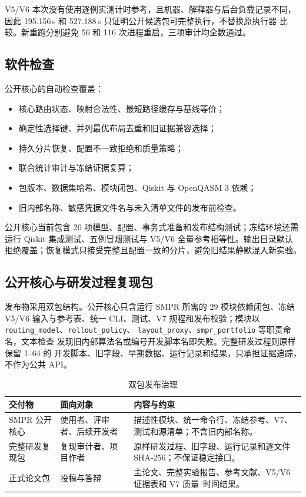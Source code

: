 \documentclass[11pt,a4paper]{article}
\begin{document}
V5/V6 本次没有使用逐例实测计时参考，且机器、解释器与后台负载记录不同，
因此 195.156\,s 和 527.188\,s 只证明公开候选包可完整执行，不替换原执行器
比较。新重跑分别避免 56 和 116 次进程重启，三项审计均全数通过。

\subsection{软件检查}

公开核心的自动检查覆盖：

\begin{itemize}
  \item 核心路由状态、映射合法性、最短路径缓存与基线等价；
  \item 确定性选择键、并列最优布局去重和旧证据兼容选择；
  \item 持久分片恢复、配置不一致拒绝和质量策略；
  \item 联合统计审计与冻结证据复算；
  \item 包版本、数据集哈希、模块闭包、Qiskit 与 OpenQASM 3 依赖；
  \item 旧内部名称、敏感凭据文件名与未入清单文件的发布前检查。
\end{itemize}

公开核心当前包含 20 项模型、配置、事务式准备和发布结构测试；冻结环境还需
运行 Qiskit 集成测试、五例冒烟测试与 V5/V6 全量参考相等性。输出目录默认
拒绝覆盖；恢复模式只接受完整且配置一致的分片，避免旧结果静默混入新实验。

\subsection{公开核心与研发过程复现包}

发布物采用双包结构。公开核心只含运行 SMPR 所需的 29 模块依赖闭包、冻结
V5/V6 输入与参考表、统一 CLI、测试、V7 规程和发布校验；模块以
\texttt{routing\_model}、\texttt{rollout\_policy}、
\texttt{layout\_proxy}、\texttt{smpr\_portfolio} 等职责命名，文本检查
发现旧内部算法名或编号开发脚本名即失败。完整研发过程则原样保留 1--64 的
开发脚本、旧字段、早期数据、运行记录和结果，只承担证据追踪，不作为公共 API。

\begin{table}[H]
\centering
\caption{双包发布治理}
\begin{tabularx}{\textwidth}{p{}p{}Y}
\toprule
交付物 & 面向对象 & 内容与约束 \\
\midrule
SMPR 公开核心 &
使用者、评审者、后续开发者 &
描述性模块、统一命令行、冻结参考、V7、测试和源清单；不含旧内部名称。\\
完整研发复现包 &
复现审计者、项目作者 &
原样研发过程、旧字段、运行记录和逐文件 SHA-256；不保证稳定接口。\\
正式论文包 &
投稿与答辩 &
主论文、完整实验报告、参考文献、V5/V6 证据表和 V7 质量--时间结果。\\
\bottomrule
\end{tabularx}
\end{table}
\end{document}
